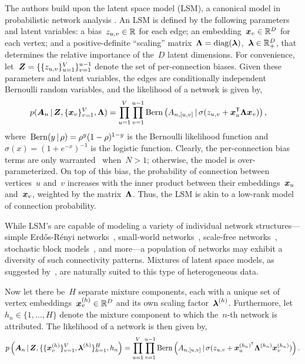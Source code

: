 The authors build upon the latent space model (LSM), a canonical model
in probabilistic network analysis \citep{hoff2002latent,
  hoff2008modeling}. An LSM is defined by the following parameters and
latent variables: a bias~${z_{u,v} \in \mathbb{R}}$ for each edge; an
embedding~${\boldsymbol{x}_v \in \mathbb{R}^D}$ for each vertex; and a
positive-definite ``scaling''
matrix~${\boldsymbol{\Lambda} = \operatorname{diag}(\boldsymbol{\lambda})}$,~$\boldsymbol{\lambda} \in \mathbb{R}_+^D$, that
determines the relative importance of the~$D$ latent dimensions.  For
convenience, let~${\boldsymbol{Z} = \{\{z_{u,v}\}_{u=1}^V\}_{v=1}^{u-1}}$ denote
the set of per-connection biases.  Given these parameters and latent
variables, the edges are conditionally independent Bernoulli random
variables, and the likelihood of a network is given by,
\begin{align}
  p(\boldsymbol{A}_{n} \, | \, \boldsymbol{Z}, \{\boldsymbol{x}_v\}_{v=1}^V, \boldsymbol{\Lambda})
  &= \prod_{u=1}^V \prod_{v=1}^{u-1} \mathrm{Bern} \left(A_{n, [u,v]} \, | \,
    \sigma(z_{u,v} + \boldsymbol{x}_u^{\mathsf{T}} \boldsymbol{\Lambda} \boldsymbol{x}_v)\right),
\end{align}
where~${\mathrm{Bern}(y \, | \, \rho) = \rho^y (1-\rho)^{1-y}}$ is the Bernoulli likelihood function
and~${\sigma(x) = (1+e^{-x})^{-1}}$ is the logistic function.
Clearly, the per-connection bias terms are only warranted
~when~${N > 1}$; otherwise, the model is over-parameterized.
On top of this bias, the probability of connection between vertices~$u$
and~$v$ increases with the inner product between their embeddings~$\boldsymbol{x}_u$
and~$\boldsymbol{x}_v$, weighted by the matrix~$\boldsymbol{\Lambda}$. Thus, the LSM is akin
to a low-rank model of connection probability. 

While LSM's are capable of modeling a variety of individual network
structures---simple Erd\H{o}s-R\'{e}nyi
networks~\citep{erdos1959random}, small-world
networks~\citep{watts1998collective}, scale-free
networks~\citep{barabasi1999emergence}, stochastic block
models~\citep{nowicki2001estimation, airoldi2008mixed}, and more---a
population of networks may exhibit a diversity of such connectivity
patterns.  Mixtures of latent space models, as suggested
by~\citet{durante2016nonparametric}, are naturally suited to this type
of heterogeneous data.

Now let there
be~$H$ separate mixture components, each with 
a unique set of vertex embeddings~${\boldsymbol{x}_v^{(h)} \in \mathbb{R}^D}$
and its own scaling factor~$\boldsymbol{\lambda}^{(h)}$. Furthermore,
let~${h_n \in \{1, \ldots, H\}}$ denote the mixture component
to which the~$n$-th network is attributed. 
The likelihood of a network is then
given by,
\begin{align}
  \label{eq:molsm_lkhd}
  p \left(\boldsymbol{A}_n \, | \,
    \boldsymbol{Z}, \{\{\boldsymbol{x}_v^{(h)}\}_{v=1}^V,
  \boldsymbol{\lambda}^{(h)}\}_{h=1}^H, h_n \right) 
  = \prod_{u=1}^V \prod_{v=1}^{u-1}
  \mathrm{Bern} \left(A_{n,[u,v]} \, | \,
    \sigma(z_{u,v} + \boldsymbol{x}_{u}^{(h_n)^{\mathsf{T}}} \boldsymbol{\Lambda}^{(h_n)} \boldsymbol{x}_v^{(h_n)}) \right).
\end{align}

